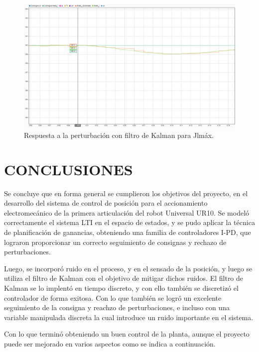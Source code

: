 \documentclass{article}
\begin{document}
\begin{sloppypar}
\begin{figure}[H]
    \centering
    \includegraphics[width=1\textwidth]{Respuesta a la perturbación con filtro de Kalman para Jlmáx}
    \caption{Respuesta a la perturbación con filtro de Kalman para Jlmáx.}
    \label{fig:Respuesta a la perturbación con filtro de Kalman para Jlmáx}
\end{figure}

\section{CONCLUSIONES}
\label{sec:CONCLUSIONES}

Se concluye que en forma general se cumplieron los objetivos del proyecto, en el desarrollo del sistema de control de posición para el accionamiento electromecánico de la primera articulación del robot Universal UR10. Se modeló correctamente el sistema LTI en el espacio de estados, y se pudo aplicar la técnica de planificación de ganancias, obteniendo una familia de controladores I-PD, que lograron proporcionar un correcto seguimiento de consignas y rechazo de perturbaciones.

Luego, se incorporó ruido en el proceso, y en el sensado de la posición, y luego se utiliza el filtro de Kalman con el objetivo de mitigar dichos ruidos. El filtro de Kalman se lo implentó en tiempo discreto, y con ello también se discretizó el controlador de forma exitosa. Con lo que también se logró un excelente seguimiento de la consigna y reachzo de perturbaciones, e incluso con una variable manipulada discreta la cual introduce un ruido importante en el sistema.

Con lo que terminó obteniendo un buen control de la planta, aunque el proyecto puede ser mejorado en varios aspectos como se indica a continuación.


\end{sloppypar}
\end{document}
